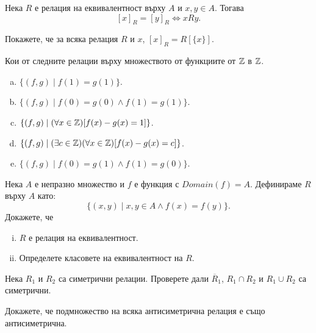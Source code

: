 \begin{lemma}
  Нека $R$ е релация на еквивалентност върху $A$ и $x,y\in A$. Тогава \[[x]_R = [y]_R \iff xRy.\]
\end{lemma}


\begin{problem}
  Покажете, че за всяка релация $R$ и $x$, $[x]_R = R[\{x\}]$.
\end{problem}

\begin{problem}
  Кои от следните релации върху множеството от функциите от $\mathbb{Z}$ в $\mathbb{Z}$.
  \begin{enumerate}[a)]
  \item
    $\{(f,g)\mid f(1) = g(1)\}$.
  \item
    $\{(f,g)\mid f(0) = g(0)\wedge f(1) = g(1)\}$.
  \item
    $\{(f,g)\mid (\forall x\in\mathbb{Z})[f(x)-g(x) = 1]\}$.
  \item
    $\{(f,g)\mid (\exists c\in\mathbb{Z})(\forall x\in\mathbb{Z})[f(x)-g(x) = c]\}$.
  \item
    $\{(f,g)\mid f(0) = g(1)\wedge f(1) = g(0)\}$.
  \end{enumerate}
\end{problem}


\begin{problem}
  Нека $A$ е непразно множество и $f$ е функция с $Domain(f) = A$.
  Дефинираме $R$ върху $A$ като:
  \[\{(x,y)\mid x,y\in A\wedge f(x) = f(y)\}.\]
  Докажете, че
  \begin{enumerate}[(i)]
  \item
    $R$ е релация на еквивалентност.
  \item
    Определете класовете на еквивалентност на $R$.
\end{enumerate}

\begin{problem}
  Нека $R_1$ и $R_2$ са симетрични релации.
  Проверете дали $\overline{R}_1$, $R_1\cap R_2$ и $R_1 \cup R_2$ са симетрични.
\end{problem}

\begin{problem}
  Докажете, че подмножество на всяка антисиметрична релация е също антисиметрична.
\end{problem}

\end{problem}




